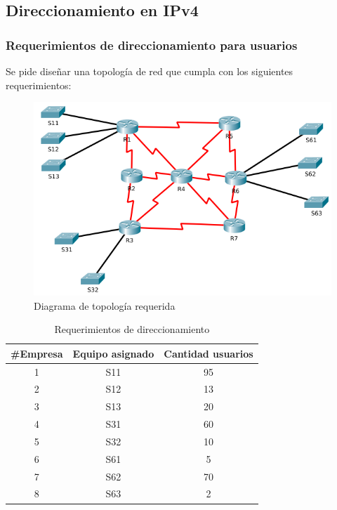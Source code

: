 \documentclass[12pt]{article}
\begin{document}
\subsection{Direccionamiento en IPv4}
\subsubsection{Requerimientos de direccionamiento para usuarios}
Se pide diseñar una topología de red que cumpla con los siguientes requerimientos:

\begin{figure}[h]
\centering
\caption{\label{fig:fig_topology} Diagrama de topología requerida}
\includegraphics[scale=0.7]{iipac2018_is511_topologia_proyecto.png}
\end{figure}

\begin{table}[ht]
\centering
\caption{Requerimientos de direccionamiento}
\begin{tabular}{|c|c|c|}
\hline
\rowcolor[HTML]{C0C0C0} 
\#Empresa&Equipo asignado& Cantidad usuarios\\ \hline
    1   &S11   &    95 \\ \hline
   2    &S12   &   13  \\ \hline
      3 &S13   &    20   \\ \hline
    4   &S31   &   60                                       \\ \hline
    5 &S32    &     10                                     \\ \hline
     6    &S61          &    5                                      \\ \hline
         7   &S62  &      70                                    \\ \hline
         8   &S63       &    2                                      \\ \hline
\end{tabular}
\end{table}
\end{document}
